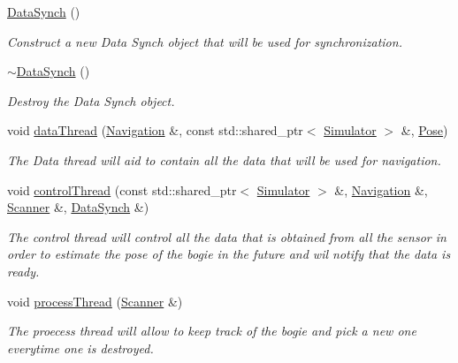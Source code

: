 \begin{DoxyCompactItemize}
\item 
\mbox{\label{classDataSynch_aadc09c8aed984237b5e672eab7dfc5cd}} 
\hyperlink{classDataSynch_aadc09c8aed984237b5e672eab7dfc5cd}{Data\+Synch} ()
\begin{DoxyCompactList}\small\item\em Construct a new Data Synch object that will be used for synchronization. \end{DoxyCompactList}\item 
\mbox{\label{classDataSynch_a5c6029e73866f805e08c98adcf6a704f}} 
\hyperlink{classDataSynch_a5c6029e73866f805e08c98adcf6a704f}{$\sim$\+Data\+Synch} ()
\begin{DoxyCompactList}\small\item\em Destroy the Data Synch object. \end{DoxyCompactList}\item 
void \hyperlink{classDataSynch_a1d6aa1bf31e4703cdcc5bcf3d8eed33b}{data\+Thread} (\hyperlink{classNavigation}{Navigation} \&, const std\+::shared\+\_\+ptr$<$ \hyperlink{classSimulator}{Simulator} $>$ \&, \hyperlink{structPose}{Pose})
\begin{DoxyCompactList}\small\item\em The Data thread will aid to contain all the data that will be used for navigation. \end{DoxyCompactList}\item 
void \hyperlink{classDataSynch_a2f50b744f9f8b3e98b226d1227b0d217}{control\+Thread} (const std\+::shared\+\_\+ptr$<$ \hyperlink{classSimulator}{Simulator} $>$ \&, \hyperlink{classNavigation}{Navigation} \&, \hyperlink{classScanner}{Scanner} \&, \hyperlink{classDataSynch}{Data\+Synch} \&)
\begin{DoxyCompactList}\small\item\em The control thread will control all the data that is obtained from all the sensor in order to estimate the pose of the bogie in the future and wil notify that the data is ready. \end{DoxyCompactList}\item 
void \hyperlink{classDataSynch_a18d67221566d1882c8677cb11813f6ab}{process\+Thread} (\hyperlink{classScanner}{Scanner} \&)
\begin{DoxyCompactList}\small\item\em The proecess thread will allow to keep track of the bogie and pick a new one everytime one is destroyed. \end{DoxyCompactList}\end{DoxyCompactItemize}


